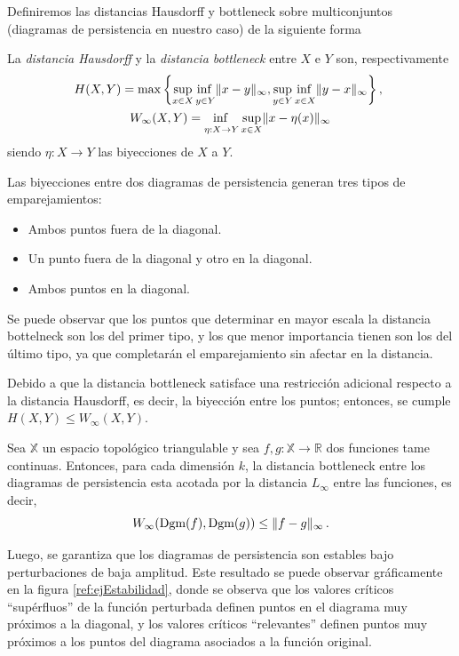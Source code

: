 Definiremos las distancias Hausdorff y bottleneck sobre multiconjuntos (diagramas de persistencia en nuestro caso) de la siguiente forma
\begin{definition}
La \emph{distancia Hausdorff} y la \emph{distancia bottleneck} entre $X$ e $Y$ son, respectivamente
\begin{gather*}
H(X, Y) = \max\left\{ \adjustlimits\sup_{x\in X} \inf_{y\in Y} \norm{x-y}_\infty, \adjustlimits\sup_{y\in Y} \inf_{x\in X} \norm{y-x}_\infty \right\},\ \\
W_\infty(X, Y) = \adjustlimits\inf_{\eta: X \to Y} \sup_{x\in X} \norm{x-\eta(x)}_\infty
\end{gather*}
siendo $\eta: X \to Y$ las biyecciones de $X$ a $Y$.
\end{definition}
Las biyecciones entre dos diagramas de persistencia generan tres tipos de emparejamientos:
\begin{itemize}
	\item Ambos puntos fuera de la diagonal.
	\item Un punto fuera de la diagonal y otro en la diagonal.
	\item Ambos puntos en la diagonal.
\end{itemize}
Se puede observar que los puntos que determinar en mayor escala la distancia bottelneck son los del primer tipo, y los que menor importancia tienen son los del último tipo, ya que completarán el emparejamiento sin afectar en la distancia.

\begin{remark}
Debido a que la distancia bottleneck satisface una restricción adicional respecto a la distancia Hausdorff, es decir, la biyección entre los puntos; entonces, se cumple $H(X, Y) \leq W_\infty(X, Y)$.
\end{remark}

\begin{theorem}
Sea $\mathbb{X}$ un espacio topológico triangulable y sea $f,g: \mathbb{X} \to \mathbb{R}$ dos funciones tame continuas. Entonces, para cada dimensión $k$, la distancia bottleneck entre los diagramas de persistencia esta acotada por la distancia $L_\infty$ entre las funciones, es decir,
\[
W_\infty(\text{\rm Dgm}(f), \text{\rm Dgm}(g)) \leq \lVert f-g\rVert_\infty\,.
\]
\end{theorem}

Luego, se garantiza que los diagramas de persistencia son estables bajo perturbaciones de baja amplitud. Este resultado se puede observar gráficamente en la figura \ref{ref:ejEstabilidad}, donde se observa que los valores críticos ``supérfluos'' de la función perturbada definen puntos en el diagrama muy próximos a la diagonal, y los valores críticos ``relevantes'' definen puntos muy próximos a los puntos del diagrama asociados a la función original.

